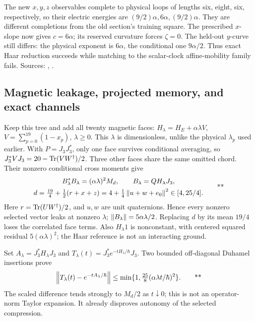 The new \(x,y,z\) observables complete to physical loops of lengths
six, eight, six, respectively, so their electric energies are
\((9/2)\alpha,6\alpha,(9/2)\alpha\).
They are different completions from the old section's training square.
The prescribed \(x\)-slope now gives \(c=6\alpha\); its reserved
curvature forces \(\zeta=0\). The held-out \(y\)-curve still differs:
the physical exponent is \(6\alpha\), the conditional one \(9\alpha/2\).
Thus exact Haar reduction succeeds while matching to the scalar-clock
affine-mobility family fails. Sources:
,
.

\subsection{Magnetic leakage, projected memory, and exact channels \workstar}
\label{sec:middle-memory}

Keep this tree and add all twenty magnetic faces:
\(H_\lambda=H_E+\alpha\lambda V\), \(V=\sum_{p=0}^{19}(1-x_p)\),
\(\lambda\ge0\). This \(\lambda\) is dimensionless, unlike the physical
\(\lambda_p\) used earlier. With \(P=J_3J_3^*\), only one face survives
conditional averaging, so \(J_3^*VJ_3=20-\operatorname{Tr}(VW^\dagger)/2\).
Three other faces share the same omitted chord. Their nonzero conditional
cross moments give
\begin{equation}
 \begin{gathered}
 B_\lambda^*B_\lambda=(\alpha\lambda)^2M_d,\qquad
 B_\lambda=QH_\lambda J_3,\\
 d=\tfrac{19}{4}+\tfrac12(r+x+z)
   =4+\tfrac14\left\lVert u+w+e_0\right\rVert^2\in[4,25/4].
 \end{gathered}
 \qquad\text{**}
 \label{eq:middle-leakage}
\end{equation}
Here \(r=\operatorname{Tr}(UW^\dagger)/2\), and \(u,w\) are unit quaternions.
Hence every nonzero selected vector leaks at nonzero \(\lambda\);
\(\left\lVert B_\lambda\right\rVert=5\alpha\lambda/2\).
Replacing \(d\) by its mean \(19/4\) loses the correlated face terms.
Also \(H_\lambda1\) is nonconstant, with centered squared residual
\(5(\alpha\lambda)^2\); the Haar reference is not an interacting ground.

Set \(A_\lambda=J_3^*H_\lambda J_3\) and
\(T_\lambda(t)=J_3^*e^{-tH_\lambda/\hbar}J_3\).
Two bounded off-diagonal Duhamel insertions prove
\[
 \left\lVert T_\lambda(t)-e^{-tA_\lambda/\hbar}\right\rVert
 \le\min\{1,\tfrac{25}{8}(\alpha\lambda t/\hbar)^2\}.
 \qquad\text{**}
\]
The scaled difference tends strongly to \(M_d/2\) as \(t\downarrow0\);
this is not an operator-norm Taylor expansion. It already disproves
autonomy of the selected compression.

